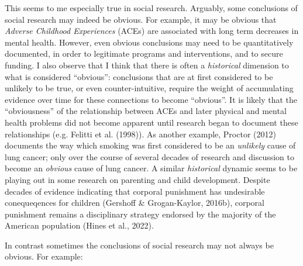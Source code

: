 \documentclass[
  letterpaper,
  DIV=11,
  numbers=noendperiod]{scrreprt}
\begin{document}
This seems to me especially true in social research. Arguably, some
conclusions of social research may indeed be obvious. For example, it
may be obvious that \emph{Adverse Childhood Experiences} (ACEs) are
associated with long term decreases in mental health. However, even
obvious conclusions may need to be quantitatively documented, in order
to legitimate programs and interventions, and to secure funding. I also
observe that I think that there is often a \emph{historical} dimension
to what is considered ``obvious'': conclusions that are at first
considered to be unlikely to be true, or even counter-intuitive, require
the weight of accumulating evidence over time for these connections to
become ``obvious''. It is likely that the ``obviousness'' of the
relationship between ACEs and later physical and mental health problems
did not become apparent until research began to document these
relationships (e.g. Felitti et al. (1998)). As another example, Proctor
(2012) documents the way which smoking was first considered to be an
\emph{unlikely} cause of lung cancer; only over the course of several
decades of research and discussion to become an \emph{obvious} cause of
lung cancer. A similar \emph{historical} dynamic seems to be playing out
in some research on parenting and child development. Despite decades of
evidence indicating that corporal punishment has undesirable
conequeqences for children (Gershoff \& Grogan-Kaylor, 2016b), corporal
punishment remains a disciplinary strategy endorsed by the majority of
the American population (Hines et al., 2022).

In contrast sometimes the conclusions of social research may not always
be obvious. For example:
\end{document}
